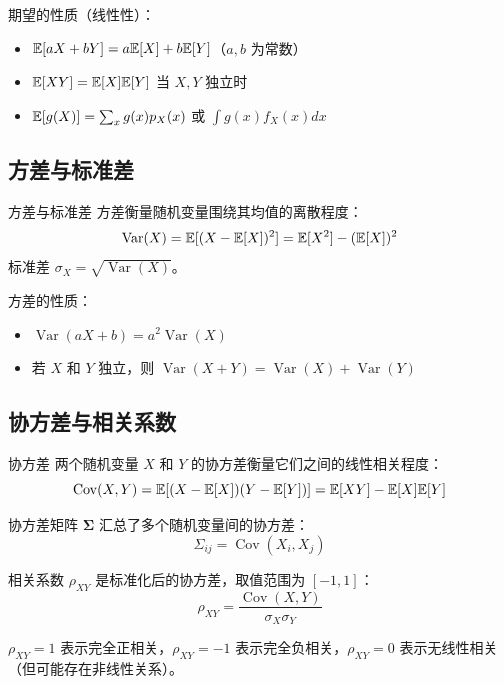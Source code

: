 期望的性质（线性性）：
\begin{itemize}
    \item $\mathbb{E}[aX+bY] = a\mathbb{E}[X] + b\mathbb{E}[Y]$（$a,b$ 为常数）
    \item $\mathbb{E}[XY] = \mathbb{E}[X]\mathbb{E}[Y]$ 当 $X,Y$ 独立时
    \item $\mathbb{E}[g(X)] = \sum_x g(x)p_X(x)$ 或 $\int g(x)f_X(x)dx$
\end{itemize}

\subsection{方差与标准差}

\begin{mydefinition}{方差与标准差}
方差衡量随机变量围绕其均值的离散程度：
\[
\operatorname{Var}(X) = \mathbb{E}[(X-\mathbb{E}[X])^2] = \mathbb{E}[X^2] - (\mathbb{E}[X])^2
\]
标准差 $\sigma_X = \sqrt{\operatorname{Var}(X)}$。
\end{mydefinition}

方差的性质：
\begin{itemize}
    \item $\operatorname{Var}(aX+b)=a^2\operatorname{Var}(X)$
    \item 若 $X$ 和 $Y$ 独立，则 $\operatorname{Var}(X+Y)=\operatorname{Var}(X)+\operatorname{Var}(Y)$
\end{itemize}

\subsection{协方差与相关系数}

\begin{mydefinition}{协方差}
两个随机变量 $X$ 和 $Y$ 的协方差衡量它们之间的线性相关程度：
\[
\operatorname{Cov}(X,Y) = \mathbb{E}[(X-\mathbb{E}[X])(Y-\mathbb{E}[Y])] = \mathbb{E}[XY] - \mathbb{E}[X]\mathbb{E}[Y]
\]
\end{mydefinition}

协方差矩阵 $\boldsymbol{\Sigma}$ 汇总了多个随机变量间的协方差：
\[
\Sigma_{ij} = \operatorname{Cov}(X_i, X_j)
\]

相关系数 $\rho_{XY}$ 是标准化后的协方差，取值范围为 $[-1,1]$：
\[
\rho_{XY} = \frac{\operatorname{Cov}(X,Y)}{\sigma_X\sigma_Y}
\]

$\rho_{XY}=1$ 表示完全正相关，$\rho_{XY}=-1$ 表示完全负相关，$\rho_{XY}=0$ 表示无线性相关（但可能存在非线性关系）。

